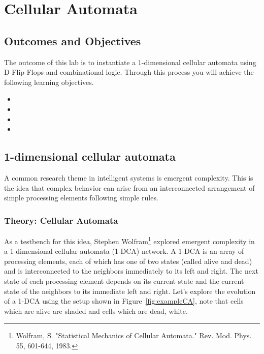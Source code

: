\chapter{Cellular Automata}
\label{chapter:cellAuto}
\graphicspath{ {./Lab07CellularAutomata/Fig} }

\section{Outcomes and Objectives}

The outcome of this lab is to instantiate a 1-dimensional
cellular automata using D-Flip Flops and combinational logic.
Through this process you will achieve the following
learning objectives.
\begin{itemize}
    \item {}
    \item {}
    \item {}
    \item {}
\end{itemize}

\section{1-dimensional cellular automata}

A common research theme in intelligent systems is emergent complexity.
This is the idea that complex behavior can arise from an interconnected
arrangement of simple processing elements following simple rules.

\subsection{Theory: Cellular Automata}
As a testbench for this idea, Stephen Wolfram\footnote{Wolfram, S.
    "Statistical Mechanics of Cellular Automata." Rev. Mod. Phys. 55,
601-644, 1983.} explored emergent complexity in a 1-dimensional
cellular automata (1-DCA) network. A 1-DCA is an array of processing
elements, each of which has one of two states (called alive and dead)
and is interconnected to the neighbors immediately to its left and
right. The next state of each processing element depends on its current
state and the current state of the neighbors to its immediate left and
right. Let's explore the evolution of a 1-DCA using the setup shown in
Figure~\ref{fig:exampleCA}, note that cells which are alive are shaded and cells which are
dead, white.

